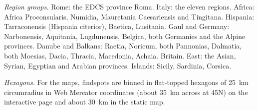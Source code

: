 \documentclass[11pt,a4paper]{article}
\begin{document}
\textit{Region groups.} Rome: the EDCS province Roma. Italy: the eleven regions. Africa: Africa Proconsularis, Numidia, Mauretania Caesariensis and Tingitana. Hispania: Tarraconensis (Hispania citerior), Baetica, Lusitania. Gaul and Germany: Narbonensis, Aquitania, Lugdunensis, Belgica, both Germanies and the Alpine provinces. Danube and Balkans: Raetia, Noricum, both Pannonias, Dalmatia, both Moesias, Dacia, Thracia, Macedonia, Achaia. Britain. East: the Asian, Syrian, Egyptian and Arabian provinces. Islands: Sicily, Sardinia, Corsica.

\textit{Hexagons.} For the maps, findspots are binned in flat-topped hexagons of 25~km circumradius in Web Mercator coordinates (about 35~km across at 45\textdegree{}N) on the interactive page and about 30~km in the static map.
\end{document}
